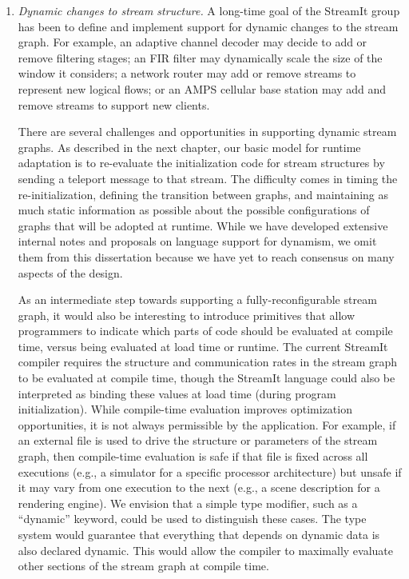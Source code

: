 \begin{enumerate}

\item {\it Dynamic changes to stream structure.}  A long-time goal of
  the StreamIt group has been to define and implement support for
  dynamic changes to the stream graph.  For example, an adaptive
  channel decoder may decide to add or remove filtering stages; an FIR
  filter may dynamically scale the size of the window it considers; a
  network router may add or remove streams to represent new logical
  flows; or an AMPS cellular base station may add and remove streams
  to support new clients.

  There are several challenges and opportunities in supporting dynamic
  stream graphs.  As described in the next chapter, our basic model
  for runtime adaptation is to re-evaluate the initialization code for
  stream structures by sending a teleport message to that stream.  The
  difficulty comes in timing the re-initialization, defining the
  transition between graphs, and maintaining as much static
  information as possible about the possible configurations of graphs
  that will be adopted at runtime.  While we have developed extensive
  internal notes and proposals on language support for dynamism, we
  omit them from this dissertation because we have yet to reach
  consensus on many aspects of the design.

  As an intermediate step towards supporting a fully-reconfigurable
  stream graph, it would also be interesting to introduce primitives
  that allow programmers to indicate which parts of code should be
  evaluated at compile time, versus being evaluated at load time or
  runtime.  The current StreamIt compiler requires the structure and
  communication rates in the stream graph to be evaluated at compile
  time, though the StreamIt language could also be interpreted as
  binding these values at load time (during program initialization).
  While compile-time evaluation improves optimization opportunities,
  it is not always permissible by the application.  For example, if an
  external file is used to drive the structure or parameters of the
  stream graph, then compile-time evaluation is safe if that file is
  fixed across all executions (e.g., a simulator for a specific
  processor architecture) but unsafe if it may vary from one execution
  to the next (e.g., a scene description for a rendering engine).  We
  envision that a simple type modifier, such as a ``dynamic'' keyword,
  could be used to distinguish these cases.  The type system would
  guarantee that everything that depends on dynamic data is also
  declared dynamic.  This would allow the compiler to maximally
  evaluate other sections of the stream graph at compile time.


\end{enumerate}
